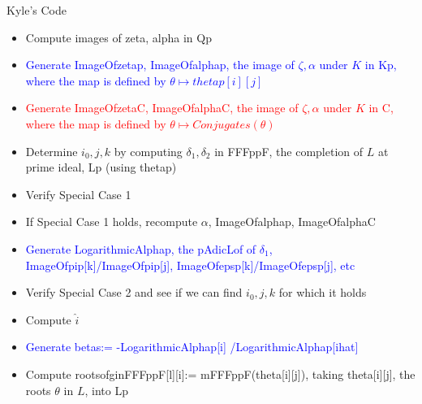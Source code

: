 \documentclass[11pt]{article}
\theoremstyle{definition}
\begin{document}
\begin{multicols}{2}
Kyle's Code
\begin{itemize}
\item Compute images of zeta, alpha in Qp
\item \textcolor{blue}{Generate ImageOfzetap, ImageOfalphap, the image of $\zeta, \alpha$ under $K$ in Kp, where the map is defined by $\theta \mapsto thetap[i][j]$}
\item \textcolor{red}{Generate ImageOfzetaC, ImageOfalphaC, the image of $\zeta, \alpha$ under $K$ in C, where the map is defined by $\theta \mapsto Conjugates(\theta)$}
\item Determine $i_0, j, k$ by computing $\delta_1, \delta_2$ in FFFppF, the completion of $L$ at prime ideal, Lp (using thetap)
\item Verify Special Case 1
\item If Special Case 1 holds, recompute $\alpha$, ImageOfalphap, ImageOfalphaC
\item \textcolor{blue}{Generate LogarithmicAlphap, the pAdicLof of $\delta_1$, ImageOfpip[k]/ImageOfpip[j], ImageOfepsp[k]/ImageOfepsp[j], etc}
\item Verify Special Case 2 and see if we can find $i_0, j,k$ for which it holds
\item Compute $\hat{i}$
\item \textcolor{blue}{Generate betas:= -LogarithmicAlphap[i] /LogarithmicAlphap[ihat]}
\item Compute rootsofginFFFppF[l][i]:= mFFFppF(theta[i][j]), taking theta[i][j], the roots $\theta$ in $L$, into Lp
\end{itemize}
\begin{center}
\end{center}

\columnbreak 


\end{multicols}
\end{document}
